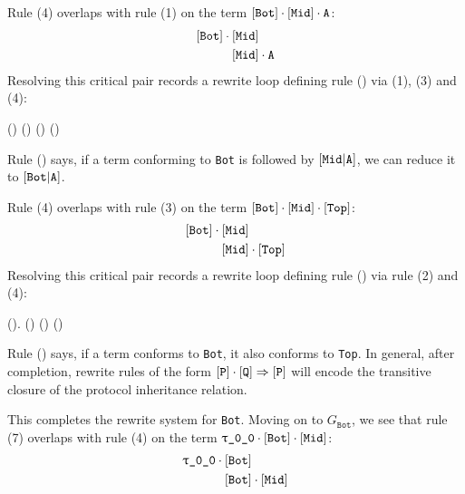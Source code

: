 \documentclass[../generics]{subfiles}
\begin{document}
\begin{example}
Rule (4) overlaps with rule (1) on the term $[\texttt{Bot}]\cdot[\texttt{Mid}]\cdot\texttt{A}$:
\begin{align*}
[\texttt{Bot}]\cdot{}&[\texttt{Mid}]\\
&[\texttt{Mid}]\cdot\texttt{A}
\end{align*}
Resolving this critical pair records a rewrite loop defining rule () via (1), (3) and (4):
\begin{center}
\FourLoopDerived%
{\cdot{}\cdot\nA}%
{\cdot{}}%
{}%
{\cdot\nA}%
{\cdot()}%
{(\cdot{}\Rightarrow{})}%
{()}%
{()\cdot\nA}
\end{center}
Rule () says, if a term conforming to \texttt{Bot} is followed by $[\texttt{Mid}|\texttt{A}]$, we can reduce it to $[\texttt{Bot}|\texttt{A}]$.

Rule (4) overlaps with rule (3) on the term $[\texttt{Bot}]\cdot[\texttt{Mid}]\cdot[\texttt{Top}]$:
\begin{align*}
[\texttt{Bot}]\cdot{}&[\texttt{Mid}]\\
&[\texttt{Mid}]\cdot[\texttt{Top}]
\end{align*}
Resolving this critical pair records a rewrite loop defining rule () via rule (2) and (4):
\begin{center}
\FourLoopDerived%
{\cdot{}\cdot{}}%
{\cdot{}}%
{}%
{\cdot{}}%
{().}%
{()}%
{()}%
{\cdot()}
\end{center}
Rule () says, if a term conforms to \texttt{Bot}, it also conforms to \texttt{Top}. In general, after completion, rewrite rules of the form $[\texttt{P}]\cdot[\texttt{Q}]\Rightarrow[\texttt{P}]$ will encode the transitive closure of the protocol inheritance relation.

This completes the rewrite system for \texttt{Bot}. Moving on to $G_\texttt{Bot}$, we see that rule (7) overlaps with rule (4) on the term $\rT\cdot\protosym{Bot}\cdot\protosym{Mid}$:
\begin{align*}
\rT\cdot{}&\protosym{Bot}\\
&\protosym{Bot}\cdot\protosym{Mid}
\end{align*}


\end{example}
\end{document}
